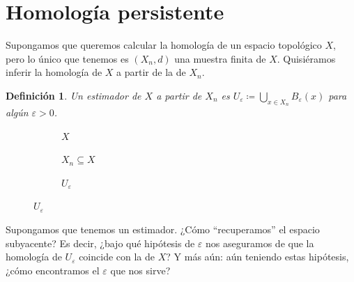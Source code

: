 \documentclass[12pt,a4paper]{article}
\newtheorem{definition}[theorem]{Definición}
\begin{document}
\section{Homología persistente}
Supongamos que queremos calcular la homología de un espacio topológico $X$, pero lo único que tenemos es $(X_n,d)$ una muestra finita de $X$. Quisiéramos inferir la homología de $X$ a partir de la de $X_n$.
\begin{definition}    
    Un estimador de $X$ a partir de $X_n$ es $\displaystyle U_\varepsilon \coloneqq \bigcup_{x \in X_n} B_\varepsilon(x)$ para algún $\varepsilon > 0$.
\end{definition}
\begin{figure}[h!]
\centering
\begin{subfigure}{0.3\textwidth}
\centering
{}
\caption*{$X$}
\end{subfigure}
\hfill
\begin{subfigure}{0.3\textwidth}
\centering
{}
\caption*{$X_n \subseteq X$}
\end{subfigure}
\hfill
\begin{subfigure}{0.3\textwidth}
\centering
{}
\caption*{$U_{\varepsilon}$}
\end{subfigure}
\end{figure}
Supongamos que tenemos un estimador. ¿Cómo ``recuperamos'' el espacio subyacente? Es decir, ¿bajo qué hipótesis de $\varepsilon$ nos aseguramos de que la homología de $U_\varepsilon$ coincide con la de $X$? Y más aún: aún teniendo estas hipótesis, ¿cómo encontramos el $\varepsilon$ que nos sirve?
\\
\end{document}
